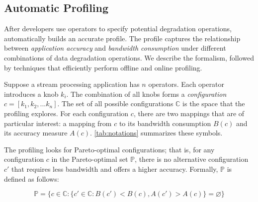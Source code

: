 \subsection{Automatic Profiling}
\label{sec:automatic-profiling}

After developers use \maybe{} operators to specify potential degradation
operations, \sysname{} automatically builds an accurate profile. The profile
captures the relationship between \textit{application accuracy} and
\textit{bandwidth consumption} under different combinations of data degradation
operations. We describe the formalism, followed by techniques that efficiently
perform offline and online profiling.

 Suppose a stream processing application has $n$
\maybe{} operators. Each operator introduces a knob $k_i$. The combination of
all knobs forms a \textit{configuration} $c = [k_{1}, k_{2}, ... k_{n}]$. The
set of all possible configurations $\mathbb{C}$ is the space that the profiling
explores. For each configuration $c$, there are two mappings that are of
particular interest: a mapping from $c$ to its bandwidth consumption $B(c)$ and
its accuracy measure $A(c)$. \autoref{tab:notations} summarizes these symbols.

The profiling looks for Pareto-optimal configurations; that is, for any
configuration $c$ in the Pareto-optimal set $\mathbb{P}$, there is no
alternative configuration $c'$ that requires less bandwidth and offers a higher
accuracy. Formally, $\mathbb{P}$ is defined as follows:

{\small \vspace{-1em}
  \begin{equation}
  \mathbb{P} = \{ c \in \mathbb{C} : \{ c' \in \mathbb{C}: B(c') < B(c),
  A(c') > A(c) \} = \varnothing\}
  \label{eq:pareto}
\end{equation}
}%

